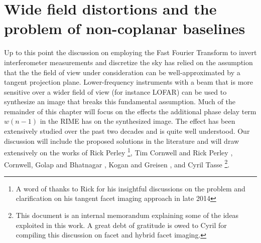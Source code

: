 \section{Wide field distortions and the problem of non-coplanar baselines}
Up to this point the discussion on employing the Fast Fourier Transform to invert interferometer measurements and discretize the sky has relied on the assumption
that the the field of view under consideration can be well-approximated by a tangent projection plane. Lower-frequency instruments with a beam that is more 
sensitive over a wider field of view (for instance LOFAR) can be used to synthesize an image that breaks this fundamental assumption. Much of the remainder of this 
chapter will focus on the effects the additional phase delay term $w(n-1)$ in the RIME has on the synthesized image. The effect has been extensively studied over 
the past two decades and is quite well understood. Our discussion will include the proposed solutions in the literature and will draw extensively on the works of 
Rick Perley \cite[Lecture 19]{taylor1999synthesis}\footnote{A word of thanks to Rick for his insightful discussions on the problem and clarification on his 
tangent facet imaging approach in late 2014}, Tim Cornwell and 
Rick Perley \cite{cornwell1992radio}, Cornwell, Golap and Bhatnagar \cite{cornwell2008noncoplanar}, Kogan and Greisen \cite{aipsfaceting}, and 
Cyril Tasse \cite{tassefaceting}\footnote{This document is an internal memorandum explaining some of the ideas exploited in this work. A great debt of gratitude 
is owed to Cyril for compiling this discussion on facet and hybrid facet imaging.}.

